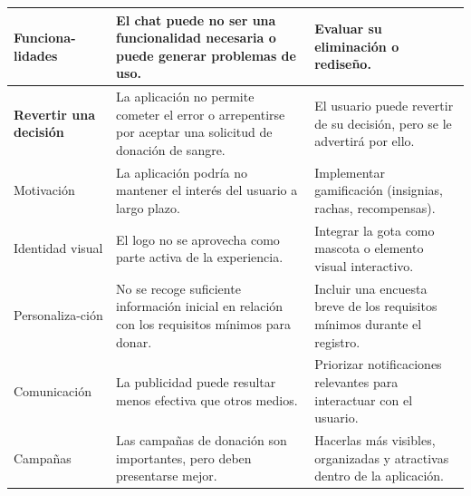 \begin{longtable}{%
  |>{\bfseries\centering\arraybackslash}p{2.8cm}%
  |>{\raggedright\arraybackslash}p{6cm}%
  |>{\raggedright\arraybackslash}p{6cm}|}
Funciona-\newline lidades &
El chat puede no ser una funcionalidad necesaria o puede generar problemas de uso. &
Evaluar su eliminación o rediseño. \\
\hline

Revertir una decisión &
La aplicación no permite cometer el error o arrepentirse por aceptar una solicitud de donación
de sangre. &
El usuario puede revertir de su decisión, pero se le advertirá por ello. \\
\hline

Motivación &
La aplicación podría no mantener el interés del usuario a largo plazo. &
Implementar gamificación (insignias, rachas, recompensas). \\
\hline

Identidad visual &
El logo no se aprovecha como parte activa de la experiencia. &
Integrar la gota como mascota o elemento visual interactivo. \\
\hline

Personaliza-\newline ción &
No se recoge suficiente información inicial en relación con los requisitos mínimos para donar. &
Incluir una encuesta breve de los requisitos mínimos durante el registro. \\
\hline

Comunicación &
La publicidad puede resultar menos efectiva que otros medios. &
Priorizar notificaciones relevantes para interactuar con el usuario. \\
\hline

Campañas &
Las campañas de donación son importantes, pero deben presentarse mejor. &
Hacerlas más visibles, organizadas y atractivas dentro de la aplicación. \\

\end{longtable}
